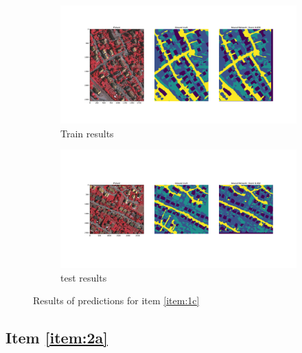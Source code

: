 \documentclass[10pt, a4paper]{article}
\begin{document}
\begin{figure}[htpb]
  \centering
  \begin{subfigure}[b]{1.0\textwidth}
      \centering
      \includegraphics[width=\textwidth]{images/Patch128_imagenet_train.pdf}
      \caption{Train results}
      \label{fig:q1c_train}
  \end{subfigure}
  \hfill
  \begin{subfigure}[b]{1.0\textwidth}
    \centering
    \includegraphics[width=\textwidth]{images/Patch128_imagenet_test.pdf}
    \caption{test results}
    \label{fig:q1c_test}
  \end{subfigure}
  \caption{Results of predictions for item \ref{item:1c}}
  \label{fig:q1c_results}
\end{figure}

\subsection{Item \ref{item:2a}}

\lipsum[1]
\end{document}
